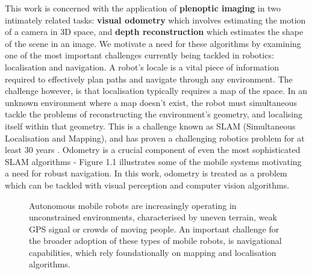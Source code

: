 This work is concerned with the application of \textbf{plenoptic imaging} in two intimately related tasks: \textbf{visual odometry} which involves estimating the motion of a camera in 3D space, and \textbf{depth reconstruction} which estimates the shape of the scene in an image. We motivate a need for these algorithms by examining one of the most important challenges currently being tackled in robotics: localisation and navigation. A robot's locale is a vital piece of information required to effectively plan paths and navigate through any environment. The challenge however, is that localisation typically requires a map of the space. In an unknown environment where a map doesn't exist, the robot must simultaneous tackle the problems of reconstructing the environment's geometry, and localising itself within that geometry. This is a challenge known as SLAM (Simultaneous Localisation and Mapping), and has proven a challenging robotics problem for at least 30 years \cite{cadena2016slam, kuehefuss2016rgbdslam}. Odometry is a crucial component of even the most sophisticated SLAM algorithms - Figure 1.1 illustrates some of the mobile systems motivating a need for robust navigation. In this work, odometry is treated as a problem which can be tackled with visual perception and computer vision algorithms. 

\begin{figure}[htbp]
    
    
    \caption[Examples of robots that operate in unconstrained spaces.]{Autonomous mobile robots are increasingly operating in unconstrained environments, characterised by uneven terrain, weak GPS signal or crowds of moving people. An important challenge for the broader adoption of these types of mobile robots, is navigational capabilities, which rely foundationally on mapping and localisation algorithms.}
\end{figure}


